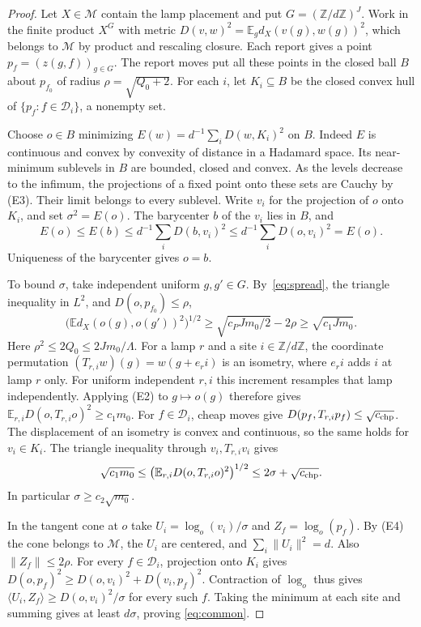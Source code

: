 \documentclass[11pt]{article}
\theoremstyle{remark}
\newcommand{\Z}{\mathbb Z}
\newcommand{\E}{\mathbb E}
\newcommand{\cM}{\mathcal M}
\newcommand{\cD}{\mathcal D}
\newcommand{\ip}[2]{\langle #1,#2\rangle}
\newcommand{\norm}[1]{\lVert #1\rVert}
\begin{document}
\begin{proof}
Let \(X\in\cM\) contain the lamp placement and put \(G=(\Z/d\Z)^J\).
Work in the finite product \(X^G\) with metric
\(D(v,w)^2=\E_g d_X(v(g),w(g))^2\), which belongs to \(\cM\) by
product and rescaling closure. Each report gives a point
\(p_f=(z(g,f))_{g\in G}\). The report moves put all these points in the
closed ball \(B\) about \(p_{f_0}\) of radius \(\rho=\sqrt{Q_0+2}\).
For each \(i\), let \(K_i\subseteq B\) be the closed convex hull of
\(\{p_f:f\in\cD_i\}\), a nonempty set.

Choose \(o\in B\) minimizing \(E(w)=d^{-1}\sum_i D(w,K_i)^2\) on \(B\).
Indeed \(E\) is continuous and convex by convexity of distance in a
Hadamard space. Its near-minimum sublevels in \(B\) are bounded, closed
and convex. As the levels decrease to the infimum, the projections of a
fixed point onto these sets are Cauchy by (E3). Their limit belongs to
every sublevel. Write \(v_i\) for the projection of \(o\)
onto \(K_i\), and set \(\sigma^2=E(o)\). The barycenter \(b\) of the
\(v_i\) lies in \(B\), and
\[
 E(o)\le E(b)\le d^{-1}\sum_i D(b,v_i)^2
       \le d^{-1}\sum_i D(o,v_i)^2=E(o).
\]
Uniqueness of the barycenter gives \(o=b\).

To bound \(\sigma\), take independent uniform \(g,g'\in G\).
By~\eqref{eq:spread}, the triangle inequality in \(L^2\), and
\(D(o,p_{f_0})\le\rho\),
\[
 \bigl(\E d_X(o(g),o(g'))^2\bigr)^{1/2}
 \ge\sqrt{c_PJm_0/2}-2\rho\ge\sqrt{c_1Jm_0}.
\]
Here \(\rho^2\le2Q_0\le 2Jm_0/\Lambda\).
For a lamp \(r\) and a site \(i\in\Z/d\Z\), the coordinate permutation
\((T_{r,i}w)(g)=w(g+e_r i)\) is an isometry, where \(e_r i\) adds \(i\)
at lamp \(r\) only. For uniform independent \(r,i\) this increment
resamples that lamp independently. Applying (E2) to \(g\mapsto o(g)\)
therefore gives \(\E_{r,i}D(o,T_{r,i}o)^2\ge c_1m_0\).
For \(f\in\cD_i\), cheap moves give
\(D(p_f,T_{r,i}p_f)\le\sqrt{c_{\rm chp}}\). The displacement of an
isometry is convex and continuous, so the same holds for \(v_i\in K_i\).
The triangle inequality through \(v_i,T_{r,i}v_i\) gives
\[
 \sqrt{c_1m_0}\le
 \bigl(\E_{r,i}D(o,T_{r,i}o)^2\bigr)^{1/2}
 \le 2\sigma+\sqrt{c_{\rm chp}}.
\]
In particular \(\sigma\ge c_2\sqrt{m_0}\).

In the tangent cone at \(o\) take \(U_i=\log_o(v_i)/\sigma\) and
\(Z_f=\log_o(p_f)\). By (E4) the cone belongs to \(\cM\), the \(U_i\)
are centered, and \(\sum_i\norm{U_i}^2=d\). Also
\(\norm{Z_f}\le2\rho\). For every \(f\in\cD_i\), projection onto \(K_i\)
gives \(D(o,p_f)^2\ge D(o,v_i)^2+D(v_i,p_f)^2\). Contraction of
\(\log_o\) thus gives
\(\ip{U_i}{Z_f}\ge D(o,v_i)^2/\sigma\) for every such \(f\).
Taking the minimum at each site and summing gives at least \(d\sigma\), proving
\eqref{eq:common}.
\end{proof}
\end{document}
